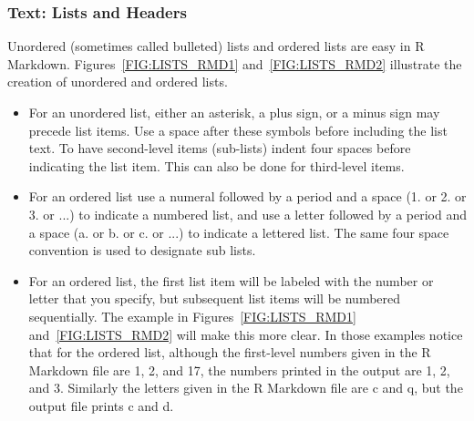 \documentclass[12pt,oneside]{book}\usepackage[]{graphicx}\usepackage[]{color}
\begin{document}
\subsubsection{Text: Lists and Headers}
Unordered (sometimes called bulleted) lists and ordered lists are easy in R Markdown. Figures~\ref{FIG:LISTS_RMD1} and~\ref{FIG:LISTS_RMD2} illustrate the creation of unordered and ordered lists.
\begin{itemize}
\item For an unordered list, either an asterisk, a plus sign, or a minus sign may precede list items. Use a space after these symbols before including the list text. To have second-level items (sub-lists) indent four spaces before indicating the list item. This can also be done for third-level items. 
\item For an ordered list use a numeral followed by a period and a space (1. or 2. or 3. or ...) to indicate a numbered list, and use a letter followed by a period and a space (a. or b. or c. or ...) to indicate a lettered list. The same four space convention is used to designate sub lists. 
\item For an ordered list, the first list item will be labeled with the number or letter that you specify, but subsequent list items will be numbered sequentially. The example in Figures~\ref{FIG:LISTS_RMD1} and~\ref{FIG:LISTS_RMD2}  will make this more clear. In those examples notice that for the ordered list, although the first-level numbers given in the R Markdown file are 1, 2, and 17, the numbers printed in the output are 1, 2, and 3. Similarly the letters given in the R Markdown file are c and q, but the output file prints c and d. 
\end{itemize}
 
\end{document}
